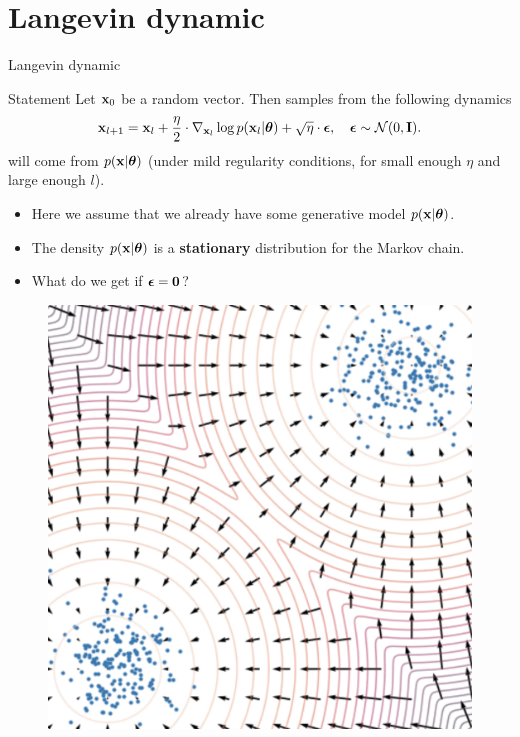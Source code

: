 \section{Langevin dynamic}
\begin{frame}{Langevin dynamic}
	\vspace{-0.4cm}
	\begin{block}{Statement}
		Let $\mathbf{x}_0$ be a random vector. Then samples from the following dynamics
		\vspace{-0.3cm}
		\[
			\mathbf{x}_{l + 1} = \mathbf{x}_l + \frac{\eta}{2} \cdot \nabla_{\mathbf{x}_l} \log p(\mathbf{x}_l | \boldsymbol{\theta}) + \sqrt{\eta} \cdot \boldsymbol{\epsilon}, \quad \boldsymbol{\epsilon} \sim \mathcal{N}(0, \mathbf{I}).
		\]
		will come from $p(\mathbf{x} | \boldsymbol{\theta})$ (under mild regularity conditions, for small enough $\eta$ and large enough $l$).
	\end{block}
	\begin{minipage}{0.55\linewidth}
		\begin{itemize}
			\item Here we assume that we already have some generative model $p(\mathbf{x} | \boldsymbol{\theta})$.
			\item The density $p(\mathbf{x} | \boldsymbol{\theta})$ is a \textbf{stationary} distribution for the Markov chain. \\
			\item What do we get if $\boldsymbol{\epsilon} = \boldsymbol{0}$?
		\end{itemize}
	\end{minipage}%
	\begin{minipage}{0.4\linewidth}
		\begin{figure}
			\centering
			\includegraphics[width=0.9\linewidth]{figs/langevin_dynamic}
		\end{figure}
	\end{minipage}
	\end{frame}
